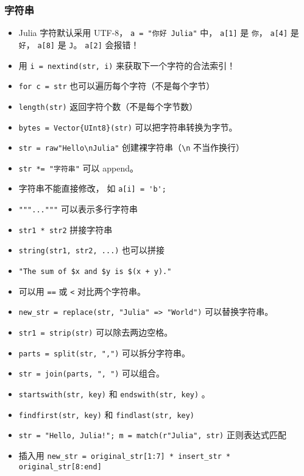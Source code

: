 \subsubsection{字符串}
\begin{itemize}
\item Julia 字符默认采用 UTF-8， \verb`a = "你好 Julia"` 中， \verb`a[1]` 是 \verb`你`， \verb`a[4]` 是 \verb`好`， \verb`a[8]` 是 \verb`J`。 \verb`a[2]` 会报错！
\item 用 \verb`i = nextind(str, i)` 来获取下一个字符的合法索引！
\item \verb`for c = str` 也可以遍历每个字符（不是每个字节）
\item \verb`length(str)` 返回字符个数（不是每个字节数）
\item \verb`bytes = Vector{UInt8}(str)` 可以把字符串转换为字节。
\item \verb`str = raw"Hello\nJulia"` 创建裸字符串（\verb`\n` 不当作换行）
\item \verb`str *= "字符串"` 可以 append。
\item 字符串不能直接修改， 如 \verb`a[i] = 'b';`
\item \verb`"""..."""` 可以表示多行字符串
\item \verb`str1 * str2` 拼接字符串
\item \verb`string(str1, str2, ...)` 也可以拼接
\item \verb`"The sum of $x and $y is $(x + y)."`
\item 可以用 \verb`==` 或 \verb`<` 对比两个字符串。
\item \verb`new_str = replace(str, "Julia" => "World")` 可以替换字符串。
\item \verb`str1 = strip(str)` 可以除去两边空格。
\item \verb`parts = split(str, ",")` 可以拆分字符串。
\item \verb`str = join(parts, ", ")` 可以组合。
\item \verb`startswith(str, key)` 和 \verb`endswith(str, key)` 。
\item \verb`findfirst(str, key)` 和 \verb`findlast(str, key)`
\item \verb`str = "Hello, Julia!"; m = match(r"Julia", str)` 正则表达式匹配
\item 插入用 \verb`new_str = original_str[1:7] * insert_str * original_str[8:end]`
\end{itemize}

